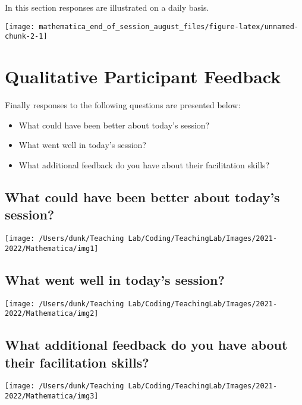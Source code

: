 \documentclass[10,a4paperpaper,]{article}
\begin{document}
In this section responses are illustrated on a daily basis.

\begin{center}\texttt{[image: mathematica\_end\_of\_session\_august\_files/figure-latex/unnamed-chunk-2-1]} \end{center}

\section{Qualitative Participant Feedback}

Finally responses to the following questions are presented below:

\begin{itemize}
\item
  What could have been better about today's session?
\item
  What went well in today's session?
\item
  What additional feedback do you have about their facilitation skills?
\end{itemize}

\subsection{What could have been better about today's session?}

\begin{center}\texttt{[image: /Users/dunk/Teaching Lab/Coding/TeachingLab/Images/2021-2022/Mathematica/img1]} \end{center}

\subsection{What went well in today's session?}

\begin{center}\texttt{[image: /Users/dunk/Teaching Lab/Coding/TeachingLab/Images/2021-2022/Mathematica/img2]} \end{center}

\subsection{What additional feedback do you have about their facilitation skills?}

\begin{center}\texttt{[image: /Users/dunk/Teaching Lab/Coding/TeachingLab/Images/2021-2022/Mathematica/img3]} \end{center}
\end{document}
